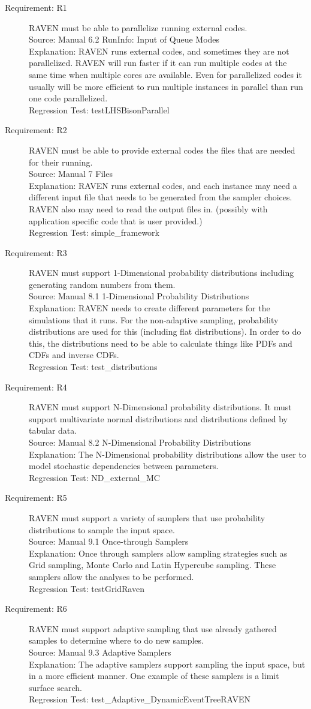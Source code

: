 \documentclass{article}
\newcommand{\requirement}[5]{\item[Requirement: #1] #2 \\Source: #3\\Explanation: #4\\Regression Test: #5}
\begin{document}
\begin{description}
\requirement{R1}{RAVEN must be able to parallelize running external codes.}
{Manual 6.2 RunInfo: Input of Queue Modes}
{RAVEN runs external codes, and sometimes they are not parallelized.  RAVEN will run faster if it can run multiple codes at the same time when multiple cores are available.  Even for parallelized codes it usually will be more efficient to run multiple instances in parallel than run one code parallelized.}
{testLHSBisonParallel}

\requirement{R2}{RAVEN must be able to provide external codes the files that are needed for their running.}
{Manual 7 Files}
{RAVEN runs external codes, and each instance may need a different input file that needs to be generated from the sampler choices.  RAVEN also may need to read the output files in. (possibly with application specific code that is user provided.)}
{simple\_framework}

\requirement{R3}{RAVEN must support 1-Dimensional probability distributions including generating random numbers from them.}
{Manual 8.1 1-Dimensional Probability Distributions}
{RAVEN needs to create different parameters for the simulations that it runs.  For the non-adaptive sampling, probability distributions are used for this (including flat distributions).  In order to do this, the distributions need to be able to calculate things like PDFs and CDFs and inverse CDFs.}
{test\_distributions}

\requirement{R4}{RAVEN must support N-Dimensional probability distributions.  It must support multivariate normal distributions and distributions defined by tabular data.}
{Manual 8.2 N-Dimensional Probability Distributions}
{The N-Dimensional probability distributions allow the user to model stochastic dependencies between parameters.}
{ND\_external\_MC}

\requirement{R5}{RAVEN must support a variety of samplers that use probability distributions to sample the input space.}
{Manual 9.1 Once-through Samplers}
{Once through samplers allow sampling strategies such as Grid sampling, Monte Carlo and Latin Hypercube sampling.  These samplers allow the analyses to be performed.}
{testGridRaven}

\requirement{R6}{RAVEN must support adaptive sampling that use already gathered samples to determine where to do new samples.}
{Manual 9.3 Adaptive Samplers}
{The adaptive samplers support sampling the input space, but in a more efficient manner.  One example of these samplers is a limit surface search.}
{test\_Adaptive\_DynamicEventTreeRAVEN}


\end{description}
\end{document}
